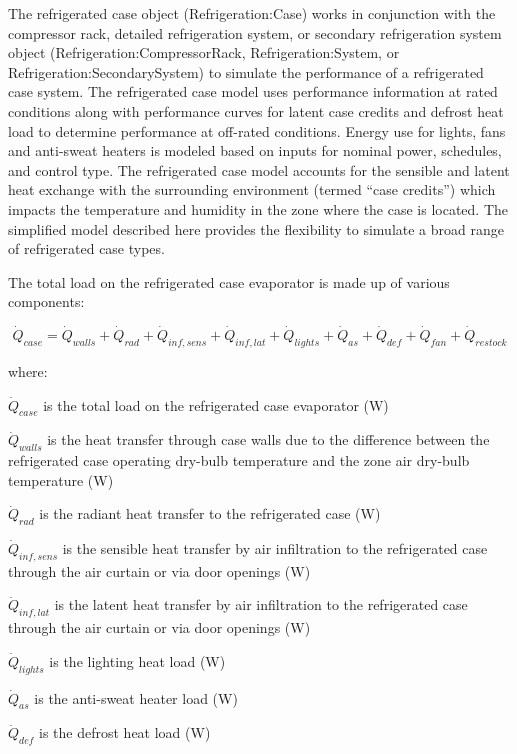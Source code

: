 The refrigerated case object (Refrigeration:Case) works in conjunction with the compressor rack, detailed refrigeration system, or secondary refrigeration system object (Refrigeration:CompressorRack, Refrigeration:System, or Refrigeration:SecondarySystem) to simulate the performance of a refrigerated case system. The refrigerated case model uses performance information at rated conditions along with performance curves for latent case credits and defrost heat load to determine performance at off-rated conditions. Energy use for lights, fans and anti-sweat heaters is modeled based on inputs for nominal power, schedules, and control type. The refrigerated case model accounts for the sensible and latent heat exchange with the surrounding environment (termed ``case credits'') which impacts the temperature and humidity in the zone where the case is located. The simplified model described here provides the flexibility to simulate a broad range of refrigerated case types.

The total load on the refrigerated case evaporator is made up of various components:

\begin{equation}
{\dot Q_{case}} = {\dot Q_{walls}} + {\dot Q_{rad}} + {\dot Q_{inf,sens}} + {\dot Q_{inf,lat}} + {\dot Q_{lights}} + {\dot Q_{as}} + {\dot Q_{def}} + {\dot Q_{fan}} + {\dot Q_{restock}}
\label{eq:TotalLoadRefCaseEvaporator}
\end{equation}

where:

\({\dot Q_{case}}\) is the total load on the refrigerated case evaporator (W)

\({\dot Q_{walls}}\) is the heat transfer through case walls due to the difference between the refrigerated case operating dry-bulb temperature and the zone air dry-bulb temperature (W)

\({\dot Q_{rad}}\) is the radiant heat transfer to the refrigerated case (W)

\({\dot Q_{inf,sens}}\) is the sensible heat transfer by air infiltration to the refrigerated case through the air curtain or via door openings (W)

\({\dot Q_{inf,lat}}\) is the latent heat transfer by air infiltration to the refrigerated case through the air curtain or via door openings (W)

\({\dot Q_{lights}}\) is the lighting heat load (W)

\({\dot Q_{as}}\) is the anti-sweat heater load (W)

\({\dot Q_{def}}\) is the defrost heat load (W)

